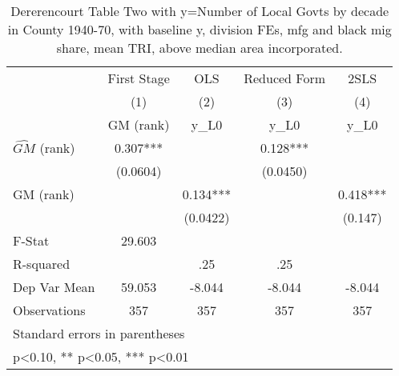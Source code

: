 \begin{table}[htbp]\centering
\def\sym#1{\ifmmode^{#1}\else\(^{#1}\)\fi}
\caption{Dererencourt Table Two with y=Number of Local Govts by decade in County 1940-70, with baseline y, division FEs, mfg and black mig share, mean TRI, above median area incorporated.}
\begin{tabular}{l*{4}{c}}
\toprule
                    & First Stage   &         OLS   &Reduced Form   &        2SLS   \\
                    &\multicolumn{1}{c}{(1)}&\multicolumn{1}{c}{(2)}&\multicolumn{1}{c}{(3)}&\multicolumn{1}{c}{(4)}\\
                    &\multicolumn{1}{c}{GM  (rank)}&\multicolumn{1}{c}{y\_L0}&\multicolumn{1}{c}{y\_L0}&\multicolumn{1}{c}{y\_L0}\\
\midrule
$\hat{GM}$ (rank)   &       0.307***&               &       0.128***&               \\
                    &    (0.0604)   &               &    (0.0450)   &               \\
\addlinespace
GM  (rank)          &               &       0.134***&               &       0.418***\\
                    &               &    (0.0422)   &               &     (0.147)   \\
\midrule
F-Stat              &      29.603   &               &               &               \\
R-squared           &               &         .25   &         .25   &               \\
Dep Var Mean        &      59.053   &      -8.044   &      -8.044   &      -8.044   \\
Observations        &         357   &         357   &         357   &         357   \\
\bottomrule
\multicolumn{5}{l}{\footnotesize Standard errors in parentheses}\\
\multicolumn{5}{l}{\footnotesize * p<0.10, ** p<0.05, *** p<0.01}\\
\end{tabular}
\end{table}
